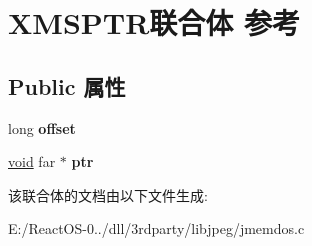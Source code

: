 \hypertarget{union_x_m_s_p_t_r}{}\section{X\+M\+S\+P\+T\+R联合体 参考}
\label{union_x_m_s_p_t_r}
\subsection*{Public 属性}
\begin{DoxyCompactItemize}
\item 
\mbox{\label{union_x_m_s_p_t_r_a00381983c7dc80dbfb1261004d25806c}} 
long {\bfseries offset}
\item 
\mbox{\label{union_x_m_s_p_t_r_a66328229e94351ef0fbd263aa2e5662c}} 
\hyperlink{interfacevoid}{void} far $\ast$ {\bfseries ptr}
\end{DoxyCompactItemize}


该联合体的文档由以下文件生成\+:\begin{DoxyCompactItemize}
\item 
E\+:/\+React\+O\+S-\/0../dll/3rdparty/libjpeg/jmemdos.\+c\end{DoxyCompactItemize}
